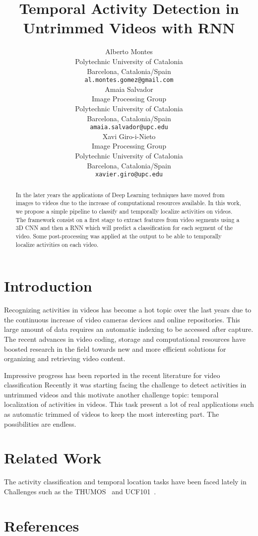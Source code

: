 \documentclass{article}
\title{Temporal Activity Detection in Untrimmed Videos with RNN}
\author{
    Alberto Montes \\
    Polytechnic University of Catalonia \\
    Barcelona, Catalonia/Spain \\
    \texttt{al.montes.gomez@gmail.com} \\
    \And
    Amaia Salvador \\
    Image Processing Group \\
    Polytechnic University of Catalonia \\
    Barcelona, Catalonia/Spain \\
    \texttt{amaia.salvador@upc.edu} \\
    \And
    Xavi Giro-i-Nieto \\
    Image Processing Group \\
    Polytechnic University of Catalonia \\
    Barcelona, Catalonia/Spain \\
    \texttt{xavier.giro@upc.edu} \\
}
\begin{document}

\maketitle

\begin{abstract}

    In the later years the applications of Deep Learning techniques have moved from images to videos due to the increase of computational resources available. In this work, we propose a simple pipeline to classify and temporally localize activities on videos. The framework consist on a first stage to extract features from video segments using a 3D CNN and then a RNN which will predict a classification for each segment of the video. Some post-processing was applied at the output to be able to temporally localize activities on each video.

\end{abstract}

\section{Introduction}

Recognizing activities in videos has become a hot topic over the last years due to the continuous increase of video cameras devices and online repositories. 
This large amount of data requires an automatic indexing to be accessed after capture.
The recent advances in video coding, storage and computational resources have boosted research in the field towards new and more efficient solutions for organizing and retrieving video content.

Impressive progress has been reported in the recent literature for video classification %
Recently it was starting facing the challenge to detect activities in untrimmed videos and this motivate another challenge topic: temporal localization of activities in videos. This task present a lot of real applications such as automatic trimmed of videos to keep the most interesting part. The possibilities are endless.

\section{Related Work}

The activity classification and temporal location tasks have been faced lately in Challenges such as the THUMOS~\cite{THUMOS15} and UCF101~\cite{UCF101}. 







\section*{References}
{\small


}
\end{document}
